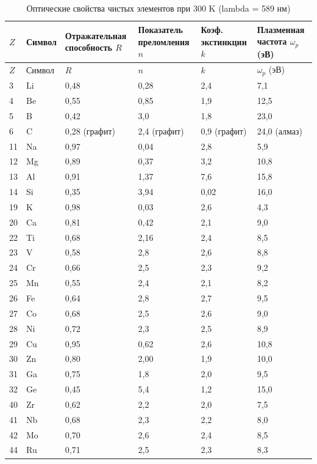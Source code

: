 \documentclass[12pt,a4paper]{article}
\begin{document}
	\begin{longtable}{p{0.8cm}p{1.2cm}p{2.2cm}p{2.2cm}p{2.2cm}p{2.2cm}}
		\caption{Оптические свойства чистых элементов при 300 K (lambda = 589 нм)} \label{tab:optical-properties-func} \\
		\toprule
		\(Z\) & Символ & Отражательная способность \(R\) & Показатель преломления \(n\) & Коэф. экстинкции \(k\) & Плазменная частота \(\omega_p\) (эВ) \\
		\midrule
		\endfirsthead
		\toprule
		\(Z\) & Символ & \(R\) & \(n\) & \(k\) & \(\omega_p\) (эВ) \\
		\midrule
		\endhead
		3  & Li & 0,48 & 0,28 & 2,4 & 7,1 \\
		4  & Be & 0,55 & 0,85 & 1,9 & 12,5 \\
		5  & B  & 0,42 & 3,0 & 1,8 & 23,0 \\
		6  & C  & 0,28 (графит) & 2,4 (графит) & 0,9 (графит) & 24,0 (алмаз) \\
		11 & Na & 0,97 & 0,04 & 2,8 & 5,9 \\
		12 & Mg & 0,89 & 0,37 & 3,2 & 10,8 \\
		13 & Al & 0,91 & 1,37 & 7,6 & 15,8 \\
		14 & Si & 0,35 & 3,94 & 0,02 & 16,0 \\
		19 & K  & 0,98 & 0,03 & 2,6 & 4,3 \\
		20 & Ca & 0,81 & 0,42 & 2,1 & 9,0 \\
		22 & Ti & 0,68 & 2,16 & 2,4 & 8,5 \\
		23 & V  & 0,58 & 2,8 & 2,6 & 8,8 \\
		24 & Cr & 0,66 & 2,5 & 2,3 & 9,2 \\
		25 & Mn & 0,55 & 2,4 & 2,1 & 8,2 \\
		26 & Fe & 0,64 & 2,8 & 2,7 & 9,5 \\
		27 & Co & 0,68 & 2,5 & 2,6 & 9,0 \\
		28 & Ni & 0,72 & 2,3 & 2,5 & 8,9 \\
		29 & Cu & 0,95 & 0,62 & 2,6 & 10,8 \\
		30 & Zn & 0,80 & 2,00 & 1,9 & 10,0 \\
		31 & Ga & 0,75 & 1,8 & 2,0 & 9,5 \\
		32 & Ge & 0,45 & 5,4 & 1,2 & 15,0 \\
		40 & Zr & 0,62 & 2,2 & 2,0 & 7,5 \\
		41 & Nb & 0,68 & 2,3 & 2,2 & 8,0 \\
		42 & Mo & 0,70 & 2,6 & 2,4 & 8,5 \\
		44 & Ru & 0,71 & 2,5 & 2,3 & 8,3 \\

\end{longtable}
\end{document}
